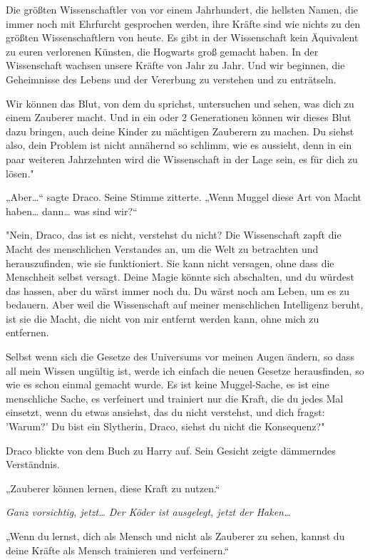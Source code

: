 {Die größten Wissenschaftler von vor einem Jahrhundert, die hellsten Namen, die immer noch mit Ehrfurcht gesprochen werden, ihre Kräfte sind wie nichts zu den größten Wissenschaftlern von heute. Es gibt in der Wissenschaft kein Äquivalent zu euren verlorenen Künsten, die Hogwarts groß gemacht haben. In der Wissenschaft wachsen unsere Kräfte von Jahr zu Jahr. Und wir beginnen, die Geheimnisse des Lebens und der Vererbung zu verstehen und zu enträtseln.

Wir können das Blut, von dem du sprichst, untersuchen und sehen, was dich zu einem Zauberer macht. Und in ein oder 2 Generationen können wir dieses Blut dazu bringen, auch deine Kinder zu mächtigen Zauberern zu machen. Du siehst also, dein Problem ist nicht annähernd so schlimm, wie es aussieht, denn in ein paar weiteren Jahrzehnten wird die Wissenschaft in der Lage sein, es für dich zu lösen."

„Aber…“ sagte Draco. Seine Stimme zitterte. „Wenn Muggel diese Art von Macht haben… dann… was sind wir?“

"Nein, Draco, das ist es nicht, verstehst du nicht? Die Wissenschaft zapft die Macht des menschlichen Verstandes an, um die Welt zu betrachten und herauszufinden, wie sie funktioniert. Sie kann nicht versagen, ohne dass die Menschheit selbst versagt. Deine Magie könnte sich abschalten, und du würdest das hassen, aber du wärst immer noch du. Du wärst noch am Leben, um es zu bedauern. Aber weil die Wissenschaft auf meiner menschlichen Intelligenz beruht, ist sie die Macht, die nicht von mir entfernt werden kann, ohne mich zu entfernen.

Selbst wenn sich die Gesetze des Universums vor meinen Augen ändern, so dass all mein Wissen ungültig ist, werde ich einfach die neuen Gesetze herausfinden, so wie es schon einmal gemacht wurde. Es ist keine Muggel-Sache, es ist eine menschliche Sache, es verfeinert und trainiert nur die Kraft, die du jedes Mal einsetzt, wenn du etwas ansiehst, das du nicht verstehst, und dich fragst: 'Warum?' Du bist ein Slytherin, Draco, siehst du nicht die Konsequenz?"

Draco blickte von dem Buch zu Harry auf. Sein Gesicht zeigte dämmerndes Verständnis.

„Zauberer können lernen, diese Kraft zu nutzen.“

\emph{Ganz vorsichtig, jetzt… Der Köder ist ausgelegt, jetzt der Haken…}

„Wenn du lernst, dich als Mensch und nicht als Zauberer zu sehen, kannst du deine Kräfte als Mensch trainieren und verfeinern.“

}
